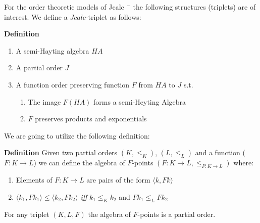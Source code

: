 			For the order theoretic models of  Jcalc $^{-}$ the following structures (triplets) 
			are of interest. We define a $Jcalc$-triplet as follows:
			\begin{mdframed}
				\textbf{Definition}
				
			\begin{enumerate}
			\item A semi-Hayting algebra $HA$
			\item A partial order $J$
			\item A function order preserving function $F$ from $HA$ to $J$ s.t.
			\begin{enumerate}
				\item The image $F(HA)$ forms a semi-Heyting Algebra
				\item $F$ preserves products and exponentials
			\end{enumerate}
			\end{enumerate}
			\end{mdframed}
			We are going to utilize the following definition: 
			\begin{mdframed}
				\textbf{Definition}
				Given two partial orders $(K,\le_{K})$, $(L,\le_{L})$ and a function ($F: K\rightarrow L$) 
				we can define the algebra of $F$-points  $(F:K \rightarrow L,\le_{F:K\rightarrow L})$
				where:
				\begin{enumerate}
					\item Elements of $F:K\rightarrow L$ are  pairs of the form $\langle k,Fk \rangle$
					\item $\langle k_1,Fk_1 \rangle \le \langle k_2, Fk_2\rangle$ \textit{iff}  $k_1\le_{K}k_2$ and $Fk_1\le_{L}Fk_2$ 
				\end{enumerate}
			\end{mdframed}

			\begin{theorem}
				For any triplet $(K,L,F)$ the algebra of $F$-points is a partial order.
			\end{theorem}

